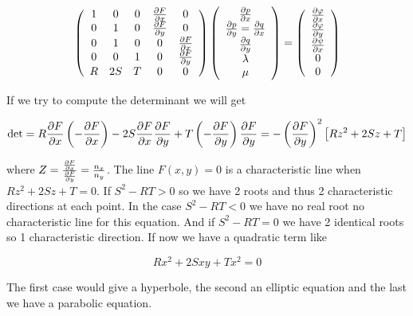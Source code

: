 \begin{equation}
\left( 
\begin{array}{ccccc}
1 & 0 & 0 & \frac{\partial F}{\partial x} & 0\\
0 & 1 & 0 & \frac{\partial F}{\partial y} & 0 \\
0 & 1 & 0 & 0 & \frac{\partial F}{\partial x} \\
0 & 0 & 1 & 0 & \frac{\partial F}{\partial y} \\
R & 2S & T & 0 & 0
\end{array}
\right)
\left( 
\begin{array}{c}
\frac{\partial p}{\partial x} \\
\frac{\partial p}{\partial y} = \frac{\partial q}{\partial x}\\
\frac{\partial q }{\partial y}\\
\lambda\\
\mu 
\end{array}
\right)
=
\left( 
\begin{array}{c}
\frac{\partial \varphi}{\partial x} \\
\frac{\partial \varphi}{\partial y} \\
\frac{\partial \psi}{\partial x}\\
0\\
0
\end{array}
\right)
\end{equation}

If we try to compute the determinant we will get 

\begin{equation}
\det = R \frac{\partial F}{\partial x} \left( - \frac{\partial F}{\partial x} \right) - 2 S \frac{\partial F}{\partial x}\frac{\partial F}{\partial y}  +T \left( -\frac{\partial F}{\partial y}\right)\frac{\partial F}{\partial y} = - \left(\frac{\partial F}{\partial y}\right) ^2 \left[ Rz^2 + 2 Sz 
+ T \right]
\end{equation}

where $Z = \frac{\frac{\partial F}{\partial x}}{\frac{\partial F}{\partial y}} = \frac{n_x}{n_y}$. The line $F(x,y) = 0$ is a characteristic line when $Rz^2 + 2Sz + T = 0$. If $S^2 - RT > 0$ so we have 2 roots and thus 2 characteristic directions at each point. In the case $S^2 - RT < 0$ we have no real root no characteristic line for this equation. And if $S^2 - RT = 0$ we have 2 identical roots so 1 characteristic direction. If now we have a quadratic term like 

\begin{equation}
R x^2 + 2S xy + Tx^2 = 0
\end{equation}

The first case would give a hyperbole, the second an elliptic equation and the last we have a parabolic equation. 

